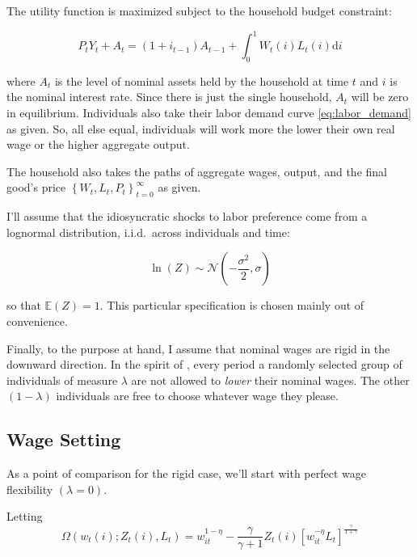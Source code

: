 \documentclass[12pt,a4paper]{scrartcl}            %
\begin{document}
The utility function is maximized subject to the household budget constraint:

\begin{equation}
    \label{eq:budget}
    P_t Y_t + A_t = \left(1 + i_{t-1}\right)A_{t-1} + \int_{0}^{1}\! W_t(i)L_t(i)\mathrm{d}i
\end{equation}

where $A_t$ is the level of nominal assets held by the household at time $t$ and $i$ is the nominal interest rate.
Since there is just the single household, $A_t$ will be zero in equilibrium.
Individuals also take their labor demand curve \ref{eq:labor_demand} as given.
So, all else equal, individuals will work more the lower their own real wage or the higher aggregate output.

The household also takes the paths of aggregate wages, output, and the final good's price $\left\{W_t, L_t, P_t \right\}_{t=0}^{\infty}$ as given.

I'll assume that the idiosyncratic shocks to labor preference come from a lognormal distribution, i.i.d.\ across individuals and time:

\begin{equation}
    \label{eq:shock_dist}
    \ln(Z) \sim \mathcal{N}\left(-\frac{\sigma^2}{2}, \sigma\right)
\end{equation}

so that $\mathbb{E}(Z) = 1$.
This particular specification is chosen mainly out of convenience.


Finally, to the purpose at hand, I assume that nominal wages are rigid in the downward direction.
In the spirit of \cite{calvo_1983}, every period a randomly selected group of individuals of measure $\lambda$ are not allowed to \emph{lower} their nominal wages.
The other $(1 - \lambda)$ individuals are free to choose whatever wage they please.
\subsection{Wage Setting}
\label{sub:wage_setting}

As a point of comparison for the rigid case, we'll start with perfect wage flexibility $(\lambda = 0)$.

Letting
\begin{equation}
    \label{eq:labor_part}
    \Omega( w_t(i); Z_t(i), L_t ) = w_{it}^{1 - \eta} - \frac{\gamma}{\gamma + 1}Z_t(i)\left[ w_{it}^{-\eta}L_t \right]^{\frac{\gamma}{1 + \gamma}}
\end{equation}
\end{document}
